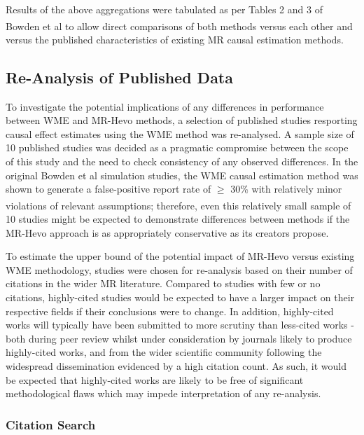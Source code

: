 \documentclass[
]{article}
\begin{document}
Results of the above aggregations were tabulated as per Tables 2 and 3 of Bowden et al\textsuperscript{} to allow direct comparisons of both methods versus each other and versus the published characteristics of existing MR causal estimation methods.

\subsection{Re-Analysis of Published Data}\label{re-analysis-of-published-data}

To investigate the potential implications of any differences in performance between WME and MR-Hevo methods, a selection of published studies resporting causal effect estimates using the WME method was re-analysed. A sample size of 10 published studies was decided as a pragmatic compromise between the scope of this study and the need to check consistency of any observed differences. In the original Bowden et al simulation studies, the WME causal estimation method was shown to generate a false-positive report rate of \(\ge\) 30\% with relatively minor violations of relevant assumptions\textsuperscript{}; therefore, even this relatively small sample of 10 studies might be expected to demonstrate differences between methods if the MR-Hevo approach is as appropriately conservative as its creators propose.

To estimate the upper bound of the potential impact of MR-Hevo versus existing WME methodology, studies were chosen for re-analysis based on their number of citations in the wider MR literature. Compared to studies with few or no citations, highly-cited studies would be expected to have a larger impact on their respective fields if their conclusions were to change. In addition, highly-cited works will typically have been submitted to more scrutiny than less-cited works - both during peer review whilst under consideration by journals likely to produce highly-cited works, and from the wider scientific community following the widespread dissemination evidenced by a high citation count. As such, it would be expected that highly-cited works are likely to be free of significant methodological flaws which may impede interpretation of any re-analysis.

\subsubsection{Citation Search}\label{citation-search}
\end{document}

